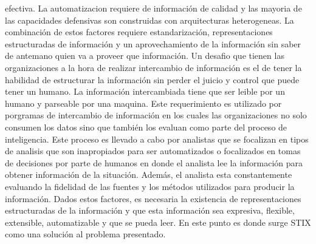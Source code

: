 efectiva.
La automatizacion requiere de información de calidad y las mayoria de las 
capacidades defensivas son construidas con arquitecturas heterogeneas. La 
combinación de estos factores requiere estandarización, representaciones 
estructuradas de información y un aprovechamiento de la información sin saber de 
antemano quien va a proveer que información.
Un desafio que tienen las organizaciones a la hora de realizar intercambio de 
información es el de tener la habilidad de estructurar la información sin perder 
el juicio y control que puede tener un humano. La información intercambiada 
tiene que ser leible por un humano y parseable por una maquina. Este 
requerimiento es utilizado por porgramas de intercambio de información en los 
cuales las organizaciones no solo consumen los datos sino que también los 
evaluan como parte del proceso de inteligencia. Este proceso es llevado a cabo 
por analistas que se focalizan en tipos de analisis que son inapropiados para 
ser automatizados o focalizados en tomas de decisiones por parte de humanos en 
donde el analista lee la información para obtener información de la situación. 
Además, el analista esta constantemente evaluando la fidelidad de las fuentes y 
los métodos utilizados para producir la información.
Dados estos factores, es necesaria la existencia de representaciones 
estructuradas de la información y que esta información sea expresiva, flexible, 
extensible, automatizable y que se pueda leer. En este punto es donde surge STIX 
como una solución al problema presentado.

